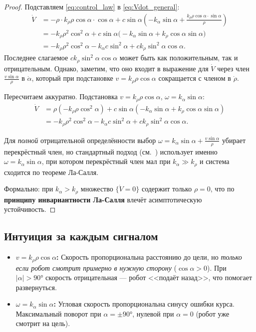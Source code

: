 \documentclass[12pt, a4paper]{article}
\theoremstyle{definition}
\theoremstyle{plain}
\begin{document}
\begin{proof}
Подставляем \eqref{eq:control_law} в \eqref{eq:Vdot_general}:
\begin{align*}
  \dot{V} &= -\rho \cdot k_\rho\rho\cos\alpha \cdot \cos\alpha
             + c\sin\alpha\!\left(-k_\alpha\sin\alpha
             + \frac{k_\rho\rho\cos\alpha \cdot \sin\alpha}{\rho}\right) \\
          &= -k_\rho\rho^2\cos^2\alpha
             + c\sin\alpha\bigl(-k_\alpha\sin\alpha + k_\rho\cos\alpha\sin\alpha\bigr) \\
          &= -k_\rho\rho^2\cos^2\alpha - k_\alpha c\sin^2\alpha
             + c k_\rho \sin^2\alpha\cos\alpha.
\end{align*}
Последнее слагаемое $c k_\rho \sin^2\alpha\cos\alpha$ может быть как
положительным, так и отрицательным.  Однако, заметим, что оно входит
в выражение для $\dot{V}$ через член $\frac{v\sin\alpha}{\rho}$ в
$\dot{\alpha}$, который при подстановке $v = k_\rho\rho\cos\alpha$
сокращается с членом в $\dot{\rho}$.

Пересчитаем аккуратно.  Подстановка $v = k_\rho\rho\cos\alpha$,
$\omega = k_\alpha\sin\alpha$:
\begin{align*}
  \dot{V} &= \rho(-k_\rho\rho\cos^2\alpha)
             + c\sin\alpha\left(-k_\alpha\sin\alpha
             + k_\rho\cos\alpha\sin\alpha\right) \\
          &= -k_\rho\rho^2\cos^2\alpha - k_\alpha c\sin^2\alpha
             + ck_\rho\sin^2\alpha\cos\alpha.
\end{align*}

Для \emph{полной} отрицательной определённости выбор $\omega = k_\alpha\sin\alpha + \frac{v\sin\alpha}{\rho}$ убирает перекрёстный член, но стандартный подход (см.\ \cite{aicardi1995}) использует именно $\omega = k_\alpha\sin\alpha$, при котором перекрёстный член мал при $k_\alpha \gg k_\rho$ и система сходится по теореме Ла-Салля.

Формально: при $k_\alpha > k_\rho$ множество $\{\dot{V} = 0\}$ содержит только
$\rho = 0$, что по \textbf{принципу инвариантности Ла-Салля} влечёт
асимптотическую устойчивость.  \qedhere
\end{proof}

\subsection{Интуиция за каждым сигналом}

\begin{itemize}
  \item \textbf{$v = k_\rho\rho\cos\alpha$:}  Скорость пропорциональна расстоянию
        до цели, но \emph{только если робот смотрит примерно в нужную сторону}
        ($\cos\alpha > 0$).  При $|\alpha| > 90°$ скорость отрицательная --- робот
        <<подаёт назад>>, что помогает развернуться.
  \item \textbf{$\omega = k_\alpha\sin\alpha$:}  Угловая скорость пропорциональна
        синусу ошибки курса.  Максимальный поворот при $\alpha = \pm90°$, нулевой
        при $\alpha = 0$ (робот уже смотрит на цель).
\end{itemize}
\end{document}
